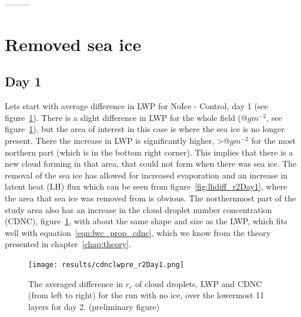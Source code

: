 ---------


\section{Removed sea ice}
\subsection{Day 1}
Lets start with average difference in LWP for NoIce - Control, day 1 (see figure~\ref{fig:relwpcdnc_r2Day1}). There is a slight difference in LWP for the whole field (@$gm^{-2}$, see figure~\ref{fig:relwpcdnc_r2Day1}), but the area of interest in this case is where the sea ice is no longer present. There the increase in LWP is significantly higher, >@$gm^{-2}$ for the most northern part (which is in the bottom right corner). This implies that there is a new cloud forming in that area, that could not form when there was sea ice. The removal of the sea ice has allowed for increased evaporation and an increase in latent heat (LH) flux which can be seen from figure~\ref{fig:lhdiff_r2Day1}, where the area that sea ice was removed from is obvious. The northernmost part of the study area also has an increase in the cloud droplet number concentration (CDNC), figure~\ref{fig:relwpcdnc_r2Day1}, with about the same shape and size as the LWP, which fits well with equation~\ref{eqn:lwc_prop_cdnc}, which we know from the theory presented in chapter~\ref{chap:theory}. 

\begin{figure}[h!]
\centering
\texttt{[image: results/cdnclwpre\_r2Day1.png]}
\caption{The averaged difference in $r_e$ of cloud droplets, LWP and CDNC (from left to right) for the run with no ice, over the lowermost 11 layers for day 2. (preliminary figure)}
\label{fig:relwpcdnc_r2Day1}
\end{figure}

